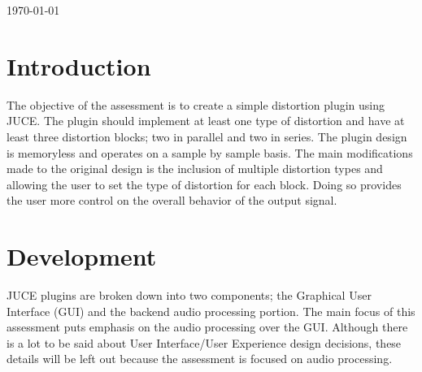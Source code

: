 \documentclass{article}
\begin{document}
\begin{titlepage}


	\vfill\vfill\vfill %

	{\large\today} %




	\vfill %

\end{titlepage}
\newpage

\clearpage

\tableofcontents
\pagebreak
\listoffigures

\clearpage

\section{Introduction}
The objective of the assessment is to create a simple distortion plugin using JUCE.
The plugin should implement at least one type of distortion and have at least three
distortion blocks; two in parallel and two in series. The plugin design is memoryless
and operates on a sample by sample basis. The main modifications made to the original
design is the inclusion of multiple distortion types and allowing the user to set the
type of distortion for each block. Doing so provides the user more control on the overall
behavior of the output signal.

\section{Development}
JUCE plugins are broken down into two components; the Graphical User Interface (GUI)
and the backend audio processing portion. The main focus of this assessment puts emphasis on
the audio processing over the GUI. Although there is a lot to be said about User Interface/User Experience design decisions, these details will be left out because the assessment is focused on audio
processing.
\end{document}
